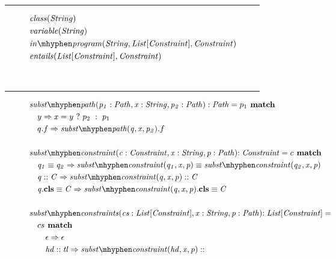 \begin{figure}[t]
\begin{subfigure}[c]{1\textwidth}
\label{subfig:axioms-naive-general-sorts}
\end{subfigure}\\
\hrule
\begin{subfigure}[c]{1\textwidth}
\centering
\begin{align*}
&\mathit{class}(\mathit{String}) \\
&\mathit{variable}(\mathit{String})\\
&\inprog(\mathit{String},\mathit{List[Constraint]}, \mathit{Constraint}) \\
&\mathit{entails}(\mathit{List[Constraint]}, \mathit{Constraint})
\end{align*}
\label{subfig:axioms-naive-general-predicates}
\end{subfigure}\\
\hrule
\begin{subfigure}[c]{1\textwidth}
\centering
\begin{align*}
&\substpath{p_1: Path}{x: String}{p_2: Path}:\mIt{Path} = p_1 \match\\
&\quad y \Rightarrow \ite{x=y}{p_2}{p_1}\\
&\quad q.f \Rightarrow \substpath{q}{x}{p_2}.f\\
\\
&\substconstr{c: Constraint}{x: String}{p: Path}\mathit{: Constraint} = c \match \\
&\quad \case{\pathEq{q_1}{q_2}}
  {\pathEq
    {\substconstr{q_1}{x}{p}}
    {\substconstr{q_2}{x}{p}}}\\
&\quad \case{\instOf{q}{C}}
  {\instOf{\substconstr{q}{x}{p}}{C}}\\
&\quad \case{\instBy{q}{C}}
  {\instBy{\substconstr{q}{x}{p}}{C}}\\\\
&\substconstrs{cs: List[Constraint]}{x: String}{p: Path}\mathit{: List[Constraint]} =\\
&\quad cs \match\\
&\qquad \case{\epsilon}{\epsilon}\\
&\qquad \case{hd :: tl}
  {\substconstr{hd}{x}{p} ::
}
\end{align*}
\end{subfigure}
\end{figure}
